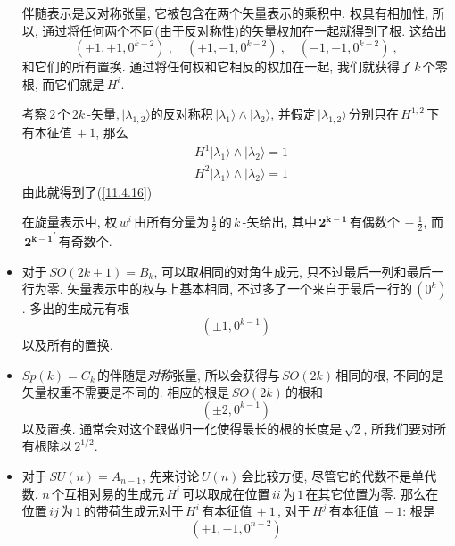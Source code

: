 \begin{itemize}
    伴随表示是反对称张量, 它被包含在两个矢量表示的乘积中. 权具有相加性, 所以, 通过将任何两个不同(由于反对称性)的矢量权加在一起就得到了根. 这给出
    \begin{equation}
        (+1,+1,0^{k-2})\:,\quad (+1,-1,0^{k-2})\:,\quad (-1,-1,0^{k-2})\:, \label{11.4.16}
    \end{equation}
    和它们的所有置换. 通过将任何权和它相反的权加在一起, 我们就获得了$\,k\,$个零根, 而它们就是$\,H^{i}$.
    \begin{tcolorbox}
    考察\,2\,个\,$2k$\,-矢量$,\lvert \lambda_{1,2}\rangle$的反对称积$\,\lvert\lambda_{1}\rangle\wedge \lvert\lambda_{2}\rangle$, 并假定$\,\lvert\lambda_{1,2}\rangle\,$分别只在$\,H^{1,2}\,$下有本征值$\,+1$, 那么
    \begin{align*}
        &H^{1}\lvert \lambda_{1} \rangle \wedge \lvert \lambda_{2} \rangle = 1\\
        &H^{2} \lvert \lambda_{1} \rangle \wedge \lvert \lambda_{2} \rangle =1
    \end{align*}
    由此就得到了(\ref{11.4.16})
    \end{tcolorbox}
    在旋量表示中, 权$\,w^{i}\,$由所有分量为$\,\frac{1}{2}\,$的$\,k\,$-矢给出, 其中$\,\mathbf{2^{k-1}}\,$有偶数个$\,-\frac{1}{2}$, 而$\,\mathbf{2^{k-1}}^{\prime}\,$有奇数个.
    \item 对于$\,SO(2k+1)=B_{k}$, 可以取相同的对角生成元, 只不过最后一列和最后一行为零. 矢量表示中的权与上基本相同, 不过多了一个来自于最后一行的$\,(0^{k})$. 多出的生成元有根
    \begin{equation}
        (\pm1,0^{k-1}) \label{11.4.17}
    \end{equation}
    以及所有的置换.
    \item $Sp(k)=C_{k}\,$的伴随是{\emph{对称}}张量, 所以会获得与$\,SO(2k)\,$相同的根, 不同的是矢量权重不需要是不同的. 相应的根是$\,SO(2k)\,$的根和
    \begin{equation}
        (\pm2,0^{k-1}) \label{11.4.18}
    \end{equation}
    以及置换. 通常会对这个跟做归一化使得最长的根的长度是$\,\sqrt{2}$, 所我们要对所有根除以$\,2^{1/2}$.
    \item 对于$\,SU(n)=A_{n-1}$, 先来讨论$\,U(n)\,$会比较方便, 尽管它的代数不是单代数. $n$\,个互相对易的生成元$\,H^{i}\,$可以取成在位置$\,ii\,$为$\,1\,$在其它位置为零. 那么在位置$\,ij\,$为$\,1\,$的带荷生成元对于$\,H^{i}\,$有本征值$\,+1\,$, 对于$\,H^{j}\,$有本征值$\,-1$: 根是
    \begin{equation}
        (+1,-1,0^{n-2})  \label{11.4.19}
    \end{equation}

\end{itemize}
